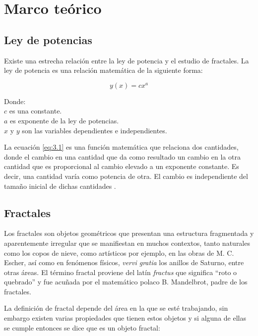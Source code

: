 \chapter{Marco te\'{o}rico}



\section{Ley de potencias} 

Existe una estrecha relación entre la ley de potencia y el estudio de fractales. La ley de potencia es una relación matemática de la siguiente forma:

\begin{equation}
	y(x) = cx^{a}
	\label{eq:3.1}
\end{equation}

Donde:\\
$c$ es una constante.\\
$a$ es exponente de la ley de potencias.\\
$x$ y $y$ son las variables dependientes e independientes. 

La ecuación \ref{eq:3.1} es una función matemática que relaciona dos cantidades, donde el cambio en una cantidad que da como resultado un cambio en la otra cantidad que es proporcional al cambio elevado a un exponente constante. Es decir, una cantidad varía como potencia de otra. El cambio es independiente del tamaño inicial de dichas cantidades \cite{Meakin1998}.



\section{Fractales}

Los fractales son objetos geométricos que presentan una estructura fragmentada y aparentemente irregular que se manifiestan en muchos contextos, tanto naturales como los copos de nieve, como artísticos por ejemplo, en las obras de M. C. Escher, así como en fenómenos físicos, \textit{vervi gratia} los anillos de Saturno, entre otras áreas. El término fractal  proviene del latín \textit{fractus} que significa ``roto o quebrado'' y fue acuñada por el matem\'{a}tico polaco B. Mandelbrot, padre de los fractales.

La definición de fractal depende del área en la que se esté trabajando, sin embargo existen varias propiedades que tienen estos objetos y si alguna de ellas se cumple entonces se dice que es un objeto fractal:

